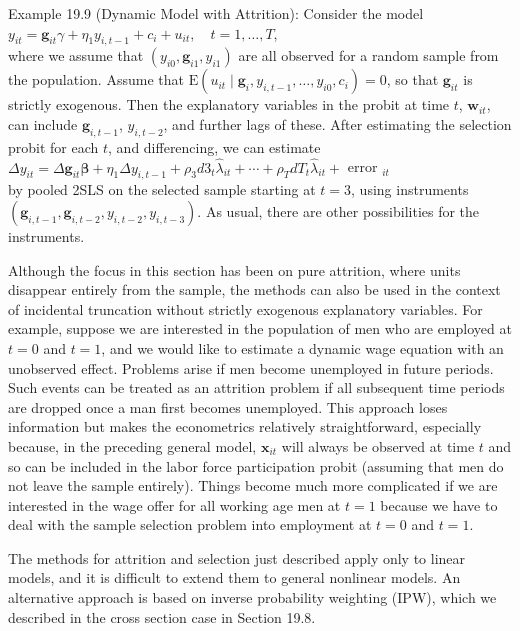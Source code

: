 \documentclass[10pt]{article}
\begin{document}
Example 19.9 (Dynamic Model with Attrition): Consider the model\\
$y_{i t}=\mathbf{g}_{i t} \gamma+\eta_{1} y_{i, t-1}+c_{i}+u_{i t}, \quad t=1, \ldots, T$,\\
where we assume that $\left(y_{i 0}, \mathbf{g}_{i 1}, y_{i 1}\right)$ are all observed for a random sample from the population. Assume that $\mathrm{E}\left(u_{i t} \mid \mathbf{g}_{i}, y_{i, t-1}, \ldots, y_{i 0}, c_{i}\right)=0$, so that $\mathbf{g}_{i t}$ is strictly exogenous. Then the explanatory variables in the probit at time $t$, $\mathbf{w}_{i t}$, can include $\mathbf{g}_{i, t-1}$, $y_{i, t-2}$, and further lags of these. After estimating the selection probit for each $t$, and differencing, we can estimate\\
$\Delta y_{i t}=\Delta \mathbf{g}_{i t} \boldsymbol{\beta}+\eta_{1} \Delta y_{i, t-1}+\rho_{3} d 3_{t} \hat{\lambda}_{i t}+\cdots+\rho_{T} d T_{t} \hat{\lambda}_{i t}+$ error $_{i t}$\\
by pooled 2SLS on the selected sample starting at $t=3$, using instruments $\left(\mathbf{g}_{i, t-1}, \mathbf{g}_{i, t-2}, y_{i, t-2}, y_{i, t-3}\right)$. As usual, there are other possibilities for the instruments.

Although the focus in this section has been on pure attrition, where units disappear entirely from the sample, the methods can also be used in the context of incidental truncation without strictly exogenous explanatory variables. For example, suppose we are interested in the population of men who are employed at $t=0$ and $t=1$, and we would like to estimate a dynamic wage equation with an unobserved effect. Problems arise if men become unemployed in future periods. Such events can be treated as an attrition problem if all subsequent time periods are dropped once a man first becomes unemployed. This approach loses information but makes the econometrics relatively straightforward, especially because, in the preceding general model, $\mathbf{x}_{i t}$ will always be observed at time $t$ and so can be included in the labor force participation probit (assuming that men do not leave the sample entirely). Things become much more complicated if we are interested in the wage offer for all working age men at $t=1$ because we have to deal with the sample selection problem into employment at $t=0$ and $t=1$.

The methods for attrition and selection just described apply only to linear models, and it is difficult to extend them to general nonlinear models. An alternative approach is based on inverse probability weighting (IPW), which we described in the cross section case in Section 19.8.
\end{document}
